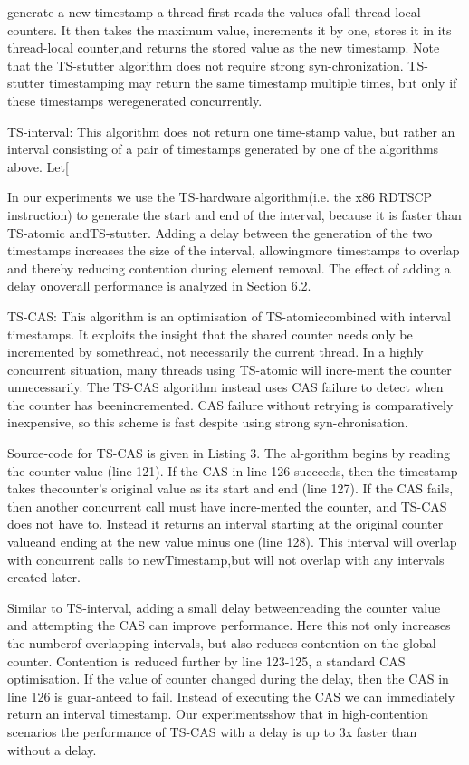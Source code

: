 generate a new timestamp a thread first reads the values ofall thread-local counters. It then takes the maximum value,
increments it by one, stores it in its thread-local counter,and returns the stored value as the new timestamp. Note
that the TS-stutter algorithm does not require strong syn-chronization. TS-stutter timestamping may return the same
timestamp multiple times, but only if these timestamps weregenerated concurrently.

TS-interval: This algorithm does not return one time-stamp value, but rather an interval consisting of a pair of
timestamps generated by one of the algorithms above. Let[

In our experiments we use the TS-hardware algorithm(i.e. the x86 RDTSCP instruction) to generate the start and
end of the interval, because it is faster than TS-atomic andTS-stutter. Adding a delay between the generation of the
two timestamps increases the size of the interval, allowingmore timestamps to overlap and thereby reducing contention
during element removal. The effect of adding a delay onoverall performance is analyzed in Section 6.2.

TS-CAS: This algorithm is an optimisation of TS-atomiccombined with interval timestamps. It exploits the insight
that the shared counter needs only be incremented by somethread, not necessarily the current thread. In a highly concurrent situation, many threads using TS-atomic will incre-ment the counter unnecessarily. The TS-CAS algorithm instead uses CAS failure to detect when the counter has beenincremented. CAS failure without retrying is comparatively
inexpensive, so this scheme is fast despite using strong syn-chronisation.

Source-code for TS-CAS is given in Listing 3. The al-gorithm begins by reading the counter value (line 121). If
the CAS in line 126 succeeds, then the timestamp takes thecounter's original value as its start and end (line 127). If
the CAS fails, then another concurrent call must have incre-mented the counter, and TS-CAS does not have to. Instead
it returns an interval starting at the original counter valueand ending at the new value minus one (line 128). This interval will overlap with concurrent calls to newTimestamp,but will not overlap with any intervals created later.

Similar to TS-interval, adding a small delay betweenreading the counter value and attempting the CAS can improve performance. Here this not only increases the numberof overlapping intervals, but also reduces contention on the
global counter. Contention is reduced further by line 123-125, a standard CAS optimisation. If the value of counter
changed during the delay, then the CAS in line 126 is guar-anteed to fail. Instead of executing the CAS we can immediately return an interval timestamp. Our experimentsshow that in high-contention scenarios the performance of
TS-CAS with a delay is up to 3x faster than without a delay.

